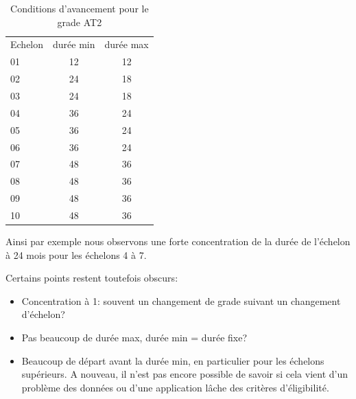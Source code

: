 \documentclass[11pt,a4paper]{article}
\begin{document}
\begin{table}[h!]
\label{means}
\centering
\caption{Conditions d'avancement pour le grade AT2} 
\footnotesize
\begin{tabular}{l|cc}
\toprule
Echelon &  durée min &  durée max \\
01  &12	&12 \\
02	&24	&18 \\
03	&24	&18\\
04	&36	&24\\
05	&36	&24 \\
06	&36	&24 \\
07	&48	&36 \\
08	&48	&36 \\
09	&48	&36 \\
10	&48	&36	 \\
%	
\bottomrule
\end{tabular}
\end{table}


Ainsi par exemple nous observons une forte concentration de la durée de l'échelon à 24 mois pour les échelons 4 à 7. 
 

Certains points restent toutefois obscurs:
\begin{itemize}[leftmargin=1cm ,parsep=0cm,itemsep=0cm,topsep=0cm] 
\item Concentration à 1: souvent un changement de grade suivant un changement d'échelon?
\item Pas beaucoup de durée max, durée min = durée fixe?
\item Beaucoup de départ avant la durée min, en particulier pour les  échelons supérieurs. A nouveau, il n'est pas encore possible de savoir si cela vient d'un problème des données ou d'une application lâche des critères d'éligibilité. 
\end{itemize}
\end{document}
